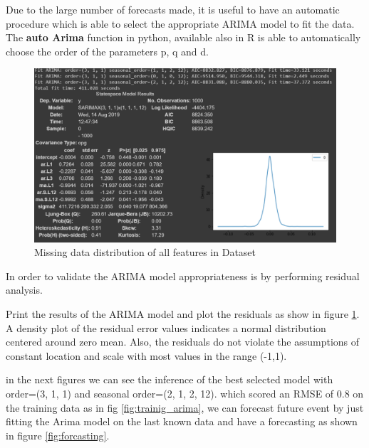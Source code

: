 Due to the large number of forecasts made, it is useful to have an
automatic procedure which is able to select the appropriate ARIMA model to fit the data. The \textbf{auto Arima} function in python, available also in R  is able to automatically choose the order of the parameters p, q and d.


\begin{figure}[H]
\centering
\includegraphics[scale=.6]{img/arima_degrees.PNG} 
\caption{Missing data distribution of all features in Dataset}
\label{fig:arima_degree}
\end{figure}

In order to validate the ARIMA model appropriateness is by performing residual analysis.

Print the results of the ARIMA model and plot the residuals as show in figure \ref{fig:arima_degree}. A density plot of the residual error values indicates a normal distribution centered around zero mean. Also, the residuals do not violate the assumptions of constant location and scale with most values in the range (-1,1).



in the next figures we can see the inference of  the best selected model with order=(3, 1, 1) and seasonal order=(2, 1, 2, 12). which scored an RMSE of 0.8 on the training data as in fig \ref{fig:trainig_arima}, we can forecast future event by just fitting the Arima model on the last  known data and have a forecasting as shown in figure \ref{fig:forcasting}.  


